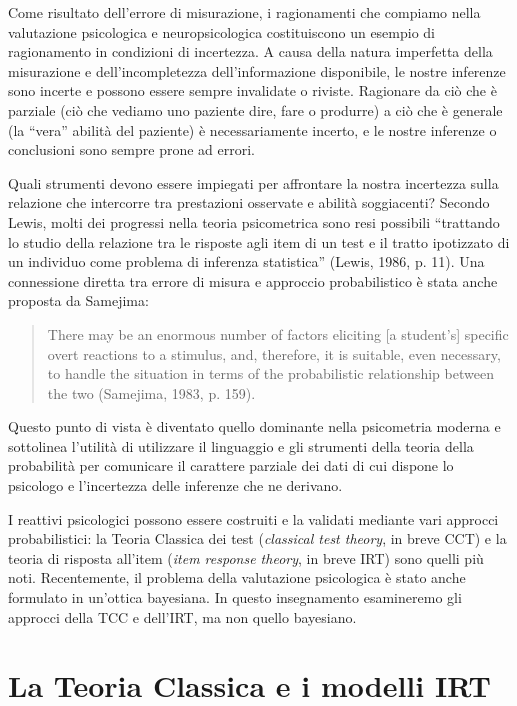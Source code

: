 Come risultato dell'errore di misurazione, i ragionamenti che compiamo nella valutazione psicologica e neuropsicologica costituiscono un esempio di ragionamento in condizioni di incertezza. A causa della natura imperfetta della misurazione e dell'incompletezza dell'informazione disponibile, le nostre inferenze sono incerte e possono essere sempre invalidate o riviste. Ragionare da ciò che è parziale (ciò che vediamo uno paziente dire, fare o produrre) a ciò che è generale (la ``vera'' abilità del paziente) è necessariamente incerto, e le nostre inferenze o conclusioni sono sempre prone ad errori.

Quali strumenti devono essere impiegati per affrontare la nostra incertezza sulla relazione che intercorre tra prestazioni osservate e abilità soggiacenti? Secondo Lewis, molti dei progressi nella teoria psicometrica sono resi possibili ``trattando lo studio della relazione tra le risposte agli item di un test e il tratto ipotizzato di un individuo come problema di inferenza statistica'' (Lewis, 1986, p. 11). Una connessione diretta tra errore di misura e approccio probabilistico è stata anche proposta da Samejima:
\begin{quote}
There may be an enormous number of factors eliciting [a student’s] specific overt reactions to a stimulus, and, therefore, it is suitable, even necessary, to handle the situation in terms of the probabilistic relationship between the two (Samejima, 1983, p. 159).
\end{quote}
Questo punto di vista è diventato quello dominante nella psicometria moderna e sottolinea l'utilità di utilizzare il linguaggio e gli strumenti della teoria della probabilità per comunicare il carattere parziale dei dati di cui dispone lo psicologo e l'incertezza delle inferenze che ne derivano. 

I reattivi psicologici possono essere costruiti e la validati mediante vari approcci probabilistici: la Teoria Classica dei test (\emph{classical test theory}, in breve CCT) e la teoria di risposta all'item (\emph{item response theory}, in breve IRT) sono quelli più noti. 
Recentemente, il problema della valutazione psicologica è stato anche formulato in un'ottica bayesiana. 
In questo insegnamento esamineremo gli approcci della TCC e dell'IRT, ma non quello bayesiano.


\section{La Teoria Classica e i modelli IRT}

